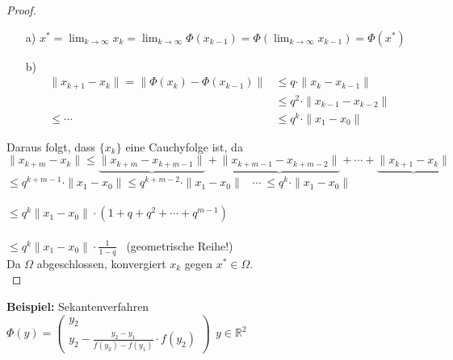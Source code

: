 \documentclass[10pt,a4paper]{article}
\theoremstyle{definition} \newtheorem{definition}{Definition}[section]
\theoremstyle{bemerkung}    \newtheorem{bemerkung}{Bemerkung}[]
\begin{document}
\begin{proof}
~
\begin{enumerate}
\item[a)] $x^*=\lim_{k \to \infty}x_k=\lim_{k \to \infty}\Phi(x_{k-1})=\Phi(\lim_{k \to \infty}x_{k-1})=\Phi(x^*)$
\item[b)]
\begin{align*}
\|x_{k+1}-x_k\| = \|\Phi(x_k)-\Phi(x_{k-1})\| &\leq q\cdot \|x_k-x_{k-1}\| \\
                                              &\leq q^2\cdot \|x_{k-1}-x_{k-2}\| \\
                                   \leq \cdots&\leq q^k\cdot \|x_1-x_0\|
\end{align*}
\end{enumerate}

Daraus folgt, dass $\{x_k\}$ eine Cauchyfolge ist, da
\\$\|x_{k+m}-x_k\|\leq \underbrace{\|x_{k+m}-x_{k+m-1}\|}+\underbrace{\|x_{k+m-1}-x_{k+m-2}\|}+\cdots +\underbrace{\|x_{k+1}-x_k\|}$
\\\hspace*{21mm}$\leq q^{k+m-1}\cdot \|x_1-x_0\|$\hspace*{3mm}$\leq q^{k+m-2}\cdot \|x_1-x_0\|$ \ $\cdots \ \leq q^k\cdot \|x_1-x_0\|$\\
\\\hspace*{21mm}$\leq q^k\|x_1-x_0\| \cdot (1+q+q^2+\cdots +q^{m-1})$\\
\\\hspace*{21mm}$\leq q^k\|x_1-x_0\| \cdot \frac{1}{1-q}$ \ (geometrische Reihe!)
\newline
\\Da $\Omega$ abgeschlossen, konvergiert $x_k$ gegen $x^* \in \Omega$.\\
\end{proof}

\textbf{Beispiel:} Sekantenverfahren
\\\hspace*{8mm}$\Phi(y)=\begin{pmatrix} y_2 \\ y_2-\frac{y_2-y_1}{f(y_2)-f(y_1)}\cdot f(y_2)\end{pmatrix} \ \ y\in \mathbb{R}^2$\\
\newline
\end{document}
